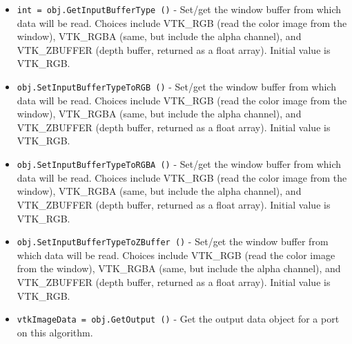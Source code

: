 \begin{itemize}
\item  \verb|int = obj.GetInputBufferType ()| -  Set/get the window buffer from which data will be read.  Choices
 include VTK\_RGB (read the color image from the window), VTK\_RGBA 
 (same, but include the alpha channel), and VTK\_ZBUFFER (depth
 buffer, returned as a float array). Initial value is VTK\_RGB.

\item  \verb|obj.SetInputBufferTypeToRGB ()| -  Set/get the window buffer from which data will be read.  Choices
 include VTK\_RGB (read the color image from the window), VTK\_RGBA 
 (same, but include the alpha channel), and VTK\_ZBUFFER (depth
 buffer, returned as a float array). Initial value is VTK\_RGB.

\item  \verb|obj.SetInputBufferTypeToRGBA ()| -  Set/get the window buffer from which data will be read.  Choices
 include VTK\_RGB (read the color image from the window), VTK\_RGBA 
 (same, but include the alpha channel), and VTK\_ZBUFFER (depth
 buffer, returned as a float array). Initial value is VTK\_RGB.

\item  \verb|obj.SetInputBufferTypeToZBuffer ()| -  Set/get the window buffer from which data will be read.  Choices
 include VTK\_RGB (read the color image from the window), VTK\_RGBA 
 (same, but include the alpha channel), and VTK\_ZBUFFER (depth
 buffer, returned as a float array). Initial value is VTK\_RGB.

\item  \verb|vtkImageData = obj.GetOutput ()| -  Get the output data object for a port on this algorithm.

\end{itemize}
